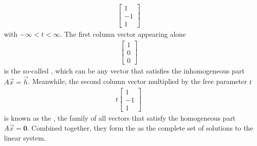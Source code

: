 \begin{solution}
\begin{align*}
\begin{bmatrix}
1 \\
-1 \\
1
\end{bmatrix}
\end{align*}
with $-\infty < t < \infty$. The first column vector appearing alone
\begin{align*}
\begin{bmatrix}
1 \\
0 \\
0
\end{bmatrix}    
\end{align*}
is the so-called , which can be any vector that satisfies the inhomogeneous part $A\vec{x} = \vec{h}$. Meanwhile, the second column vector multiplied by the free parameter $t$
\begin{align*}
t
\begin{bmatrix}
1 \\
-1 \\
1
\end{bmatrix}    
\end{align*}
is known as the , the family of all vectors that satisfy the homogeneous part $A\vec{x} = \textbf{0}$. Combined together, they form the  as the complete set of solutions to the linear system. 
\end{solution}
